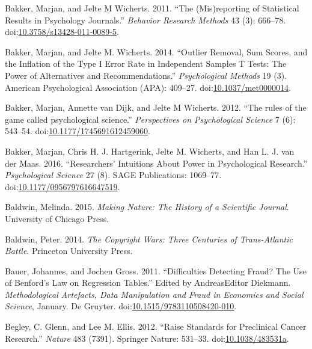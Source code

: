 \documentclass[a5paper]{book}
\begin{document}
\hypertarget{ref-doi:10.3758ux2fs13428-011-0089-5}{}
Bakker, Marjan, and Jelte M Wicherts. 2011. ``The (Mis)reporting of
Statistical Results in Psychology Journals.'' \emph{Behavior Research
Methods} 43 (3): 666--78.
doi:\href{https://doi.org/10.3758/s13428-011-0089-5}{10.3758/s13428-011-0089-5}.

\hypertarget{ref-doi:10.1037ux2fmet0000014}{}
Bakker, Marjan, and Jelte M. Wicherts. 2014. ``Outlier Removal, Sum
Scores, and the Inflation of the Type I Error Rate in Independent
Samples T Tests: The Power of Alternatives and Recommendations.''
\emph{Psychological Methods} 19 (3). American Psychological Association
(APA): 409--27.
doi:\href{https://doi.org/10.1037/met0000014}{10.1037/met0000014}.

\hypertarget{ref-doi:10.1177ux2f1745691612459060}{}
Bakker, Marjan, Annette van Dijk, and Jelte M Wicherts. 2012. ``The
rules of the game called psychological science.'' \emph{Perspectives on
Psychological Science} 7 (6): 543--54.
doi:\href{https://doi.org/10.1177/1745691612459060}{10.1177/1745691612459060}.

\hypertarget{ref-doi:10.1177ux2f0956797616647519}{}
Bakker, Marjan, Chris H. J. Hartgerink, Jelte M. Wicherts, and Han L. J.
van der Maas. 2016. ``Researchers' Intuitions About Power in
Psychological Research.'' \emph{Psychological Science} 27 (8). SAGE
Publications: 1069--77.
doi:\href{https://doi.org/10.1177/0956797616647519}{10.1177/0956797616647519}.

\hypertarget{ref-isbn:9780226261454}{}
Baldwin, Melinda. 2015. \emph{Making Nature: The History of a Scientific
Journal}. University of Chicago Press.

\hypertarget{ref-isbn:9781400851911}{}
Baldwin, Peter. 2014. \emph{The Copyright Wars: Three Centuries of
Trans-Atlantic Battle}. Princeton University Press.

\hypertarget{ref-doi:10.1515ux2f9783110508420-010}{}
Bauer, Johannes, and Jochen Gross. 2011. ``Difficulties Detecting Fraud?
The Use of Benford's Law on Regression Tables.'' Edited by AndreasEditor
Diekmann. \emph{Methodological Artefacts, Data Manipulation and Fraud in
Economics and Social Science}, January. De Gruyter.
doi:\href{https://doi.org/10.1515/9783110508420-010}{10.1515/9783110508420-010}.

\hypertarget{ref-doi:10.1038ux2f483531a}{}
Begley, C. Glenn, and Lee M. Ellis. 2012. ``Raise Standards for
Preclinical Cancer Research.'' \emph{Nature} 483 (7391). Springer
Nature: 531--33.
doi:\href{https://doi.org/10.1038/483531a}{10.1038/483531a}.
\end{document}
